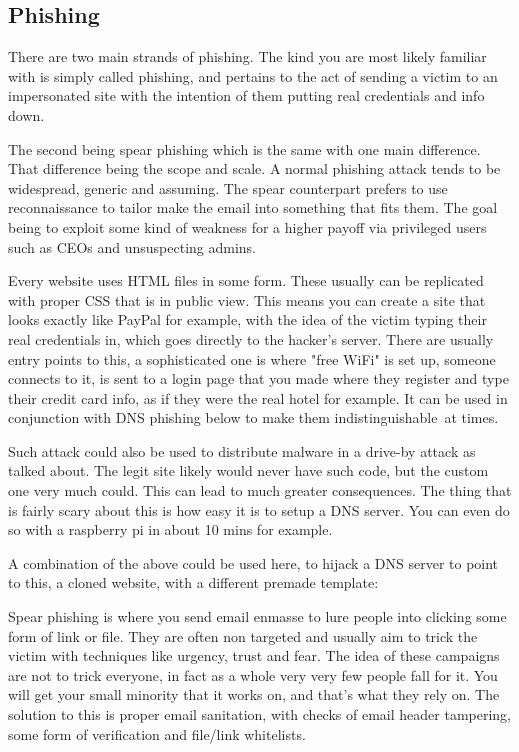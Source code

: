 \subsection{Phishing}
There are two main strands of phishing. The kind you are most likely familiar with is simply called phishing, and pertains to the act of sending a victim to an impersonated site with the intention of them putting real credentials and info down. 

The second being spear phishing which is the same with one main difference. That difference being the scope and scale. A normal phishing attack tends to be widespread, generic and assuming. The spear counterpart prefers to use reconnaissance to tailor make the email into something that fits them. The goal being to exploit some kind of weakness for a higher payoff via privileged users such as CEOs and unsuspecting admins.

Every website uses HTML files in some form. These usually can be replicated with proper CSS that is in public view. This means you can create a site that looks exactly like PayPal for example, with the idea of the victim typing their real credentials in, 
which goes directly to the hacker's server. There are usually entry points to this, a sophisticated one is where "free WiFi" is set up, someone connects to it, is sent to a login page that you made where they register and type their credit card info, 
as if they were the real hotel for example. It can be used in conjunction with DNS phishing below to make them indistinguishable at times.

Such attack could also be used to distribute malware in a drive-by attack as talked about. The legit site likely would never have such code, but the custom one very much could. This can lead to much greater consequences. The thing that is fairly scary about this is how easy it is to setup a DNS server. You can even do so with a raspberry pi in about 10 mins for example.

A combination of the above could be used here, to hijack a DNS server to point to this, a cloned website, with a different premade template:

Spear phishing is where you send email enmasse to lure people into clicking some form of link or file. They are often non targeted and usually aim to trick the victim with techniques like urgency, trust and fear. The idea of these campaigns are not to trick everyone, 
in fact as a whole very very few people fall for it. You will get your small minority that it works on, and that's what they rely on. The solution to this is proper email sanitation, with checks of email header tampering, some form of verification and file/link whitelists.

